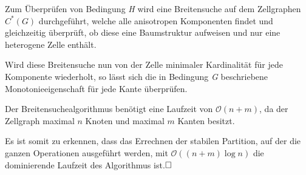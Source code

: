 Zum Überprüfen von Bedingung \emph{H} wird eine Breitensuche auf dem Zellgraphen $C^*(G)$ durchgeführt, welche alle anisotropen Komponenten findet und gleichzeitig überprüft, ob diese eine Baumstruktur aufweisen und nur eine heterogene Zelle enthält.

Wird diese Breitensuche nun von der Zelle minimaler Kardinalität für jede Komponente wiederholt, so lässt sich die in Bedingung \emph{G} beschriebene Monotonieeigenschaft für jede Kante überprüfen.

Der Breitensuchealgorithmus benötigt eine Laufzeit von $\mathcal{O}(n+m)$, da der Zellgraph maximal $n$ Knoten und maximal $m$ Kanten besitzt.

Es ist somit zu erkennen, dass das Errechnen der stabilen Partition, auf der die ganzen Operationen ausgeführt werden, mit $\mathcal{O}((n+m)\log n)$ die dominierende Laufzeit des Algorithmus ist.$\hfill\square$